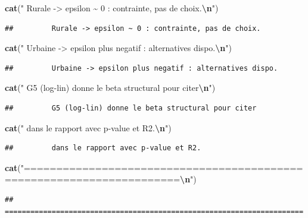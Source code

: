 \documentclass[
]{article}
\newenvironment{Shaded}{\begin{snugshade}}{\end{snugshade}}
\newcommand{\FunctionTok}[1]{\textcolor[rgb]{0.13,0.29,0.53}{\textbf{#1}}}
\newcommand{\NormalTok}[1]{#1}
\newcommand{\SpecialCharTok}[1]{\textcolor[rgb]{0.81,0.36,0.00}{\textbf{#1}}}
\newcommand{\StringTok}[1]{\textcolor[rgb]{0.31,0.60,0.02}{#1}}
\begin{document}
\begin{Shaded}
\begin{Highlighting}[]
\FunctionTok{cat}\NormalTok{(}\StringTok{"        Rurale {-}\textgreater{} epsilon \textasciitilde{} 0 : contrainte, pas de choix.}\SpecialCharTok{\textbackslash{}n}\StringTok{"}\NormalTok{)}
\end{Highlighting}
\end{Shaded}

\begin{verbatim}
##         Rurale -> epsilon ~ 0 : contrainte, pas de choix.
\end{verbatim}

\begin{Shaded}
\begin{Highlighting}[]
\FunctionTok{cat}\NormalTok{(}\StringTok{"        Urbaine {-}\textgreater{} epsilon plus negatif : alternatives dispo.}\SpecialCharTok{\textbackslash{}n}\StringTok{"}\NormalTok{)}
\end{Highlighting}
\end{Shaded}

\begin{verbatim}
##         Urbaine -> epsilon plus negatif : alternatives dispo.
\end{verbatim}

\begin{Shaded}
\begin{Highlighting}[]
\FunctionTok{cat}\NormalTok{(}\StringTok{"        G5 (log{-}lin) donne le beta structural pour citer}\SpecialCharTok{\textbackslash{}n}\StringTok{"}\NormalTok{)}
\end{Highlighting}
\end{Shaded}

\begin{verbatim}
##         G5 (log-lin) donne le beta structural pour citer
\end{verbatim}

\begin{Shaded}
\begin{Highlighting}[]
\FunctionTok{cat}\NormalTok{(}\StringTok{"        dans le rapport avec p{-}value et R2.}\SpecialCharTok{\textbackslash{}n}\StringTok{"}\NormalTok{)}
\end{Highlighting}
\end{Shaded}

\begin{verbatim}
##         dans le rapport avec p-value et R2.
\end{verbatim}

\begin{Shaded}
\begin{Highlighting}[]
\FunctionTok{cat}\NormalTok{(}\StringTok{"======================================================================}\SpecialCharTok{\textbackslash{}n}\StringTok{"}\NormalTok{)}
\end{Highlighting}
\end{Shaded}

\begin{verbatim}
## ======================================================================
\end{verbatim}
\end{document}
